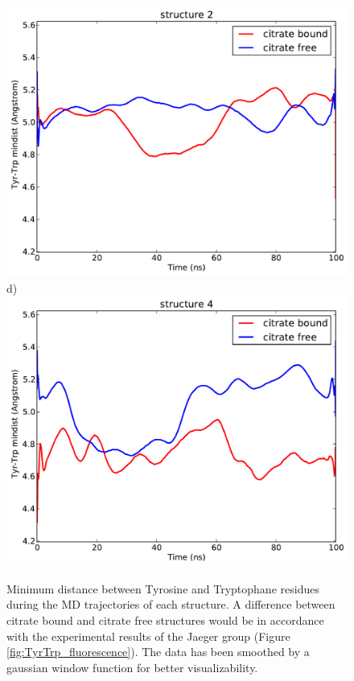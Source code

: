 \documentclass[english, a4paper, 12pt, titlepage, draft]{article}
\begin{document}
\begin{figure}
\begin{minipage}[]{0.45\linewidth}
        \includegraphics[width=\textwidth]{figures/TyrTrp/mindist_TyrTrp_structure1.pdf} 
        d)
        \includegraphics[width=\textwidth]{figures/TyrTrp/mindist_TyrTrp_structure3.pdf}  
    \end{minipage}
    \caption{Minimum distance between Tyrosine and Tryptophane residues during the MD trajectories of each structure.
        A difference between citrate bound and citrate free structures would be in accordance with the experimental results of the Jaeger group (Figure \ref{fig:TyrTrp_fluorescence}).
        The data has been smoothed by a gaussian window function for better visualizability.}
\label{fig:TyrTrp_distance}
\end{figure}  
\end{document}
